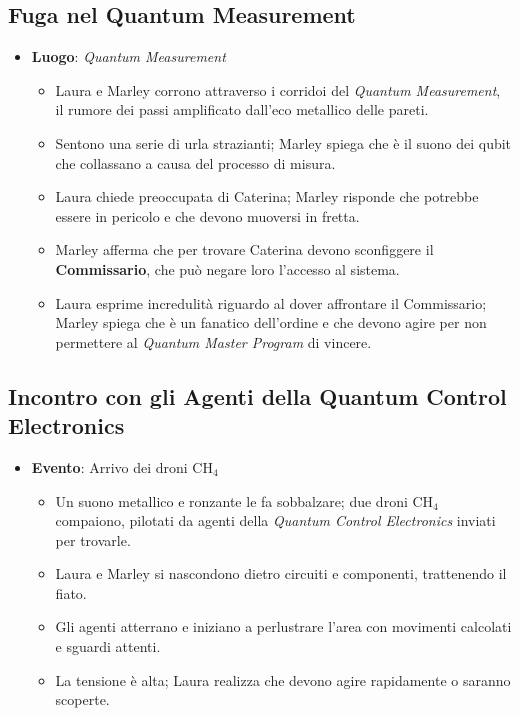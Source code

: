 \subsection*{Fuga nel Quantum Measurement}

\begin{itemize}
    \item \textbf{Luogo}: \emph{Quantum Measurement}
    \begin{itemize}
        \item Laura e Marley corrono attraverso i corridoi del \emph{Quantum Measurement}, il rumore dei passi amplificato dall'eco metallico delle pareti.
        \item Sentono una serie di urla strazianti; Marley spiega che è il suono dei qubit che collassano a causa del processo di misura.
        \item Laura chiede preoccupata di Caterina; Marley risponde che potrebbe essere in pericolo e che devono muoversi in fretta.
        \item Marley afferma che per trovare Caterina devono sconfiggere il \textbf{Commissario}, che può negare loro l'accesso al sistema.
        \item Laura esprime incredulità riguardo al dover affrontare il Commissario; Marley spiega che è un fanatico dell'ordine e che devono agire per non permettere al \emph{Quantum Master Program} di vincere.
    \end{itemize}
\end{itemize}

\subsection*{Incontro con gli Agenti della Quantum Control Electronics}

\begin{itemize}
    \item \textbf{Evento}: Arrivo dei droni CH$_4$
    \begin{itemize}
        \item Un suono metallico e ronzante le fa sobbalzare; due droni CH$_4$ compaiono, pilotati da agenti della \emph{Quantum Control Electronics} inviati per trovarle.
        \item Laura e Marley si nascondono dietro circuiti e componenti, trattenendo il fiato.
        \item Gli agenti atterrano e iniziano a perlustrare l'area con movimenti calcolati e sguardi attenti.
        \item La tensione è alta; Laura realizza che devono agire rapidamente o saranno scoperte.
    \end{itemize}
\end{itemize}

